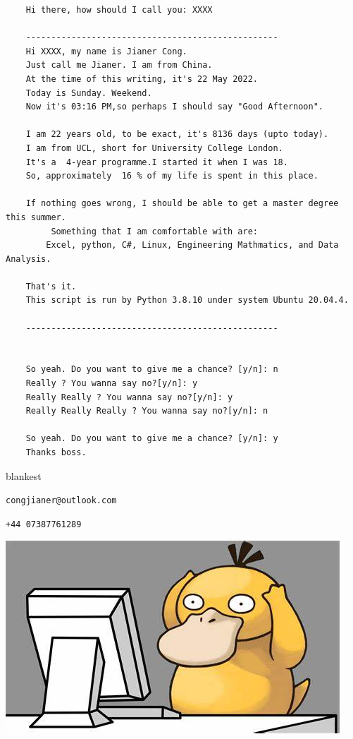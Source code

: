 \documentclass{article}
\begin{document}
\begin{tcolorbox}[title=A Self-Intro Program,listing only,
  opacityback=0.75]
\begin{verbatim}
    Hi there, how should I call you: XXXX

    --------------------------------------------------
    Hi XXXX, my name is Jianer Cong.
    Just call me Jianer. I am from China.
    At the time of this writing, it's 22 May 2022.
    Today is Sunday. Weekend.
    Now it's 03:16 PM,so perhaps I should say "Good Afternoon".

    I am 22 years old, to be exact, it's 8136 days (upto today).
    I am from UCL, short for University College London.
    It's a  4-year programme.I started it when I was 18.
    So, approximately  16 % of my life is spent in this place.

    If nothing goes wrong, I should be able to get a master degree this summer.
         Something that I am comfortable with are:
        Excel, python, C#, Linux, Engineering Mathmatics, and Data Analysis.

    That's it.
    This script is run by Python 3.8.10 under system Ubuntu 20.04.4.

    --------------------------------------------------


    So yeah. Do you want to give me a chance? [y/n]: n
    Really ? You wanna say no?[y/n]: y
    Really Really ? You wanna say no?[y/n]: y
    Really Really Really ? You wanna say no?[y/n]: n

    So yeah. Do you want to give me a chance? [y/n]: y
    Thanks boss.
\end{verbatim}
\end{tcolorbox}


\begin{tcolorbox}[adjusted title= Contact Me,
  sidebyside,
  righthand width=6cm,
  opacityback=0.5
  ]
  \begin{tcboxedraster}[raster columns=1]{blankest}
    \begin{tcolorbox}[beamer,title=Email] \texttt{congjianer@outlook.com} \end{tcolorbox}
    \begin{tcolorbox}[beamer,title=Phone] \texttt{+44 07387761289} \end{tcolorbox}
  \end{tcboxedraster}
  \tcblower{}
  \includegraphics[width=\linewidth]{pysduck.jpeg}
\end{tcolorbox}
\end{document}
